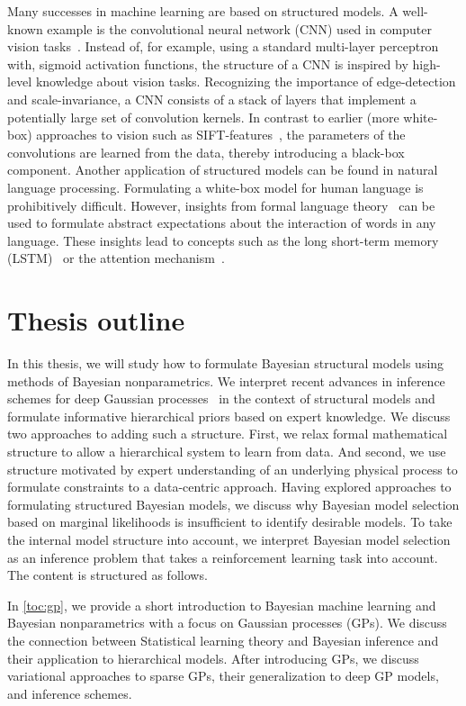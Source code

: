 Many successes in machine learning are based on structured models.
A well-known example is the convolutional neural network (CNN) used in computer vision tasks~\parencite{lecun_backpropagation_1989}.
Instead of, for example, using a standard multi-layer perceptron with, sigmoid activation functions, the structure of a CNN is inspired by high-level knowledge about vision tasks.
Recognizing the importance of edge-detection and scale-invariance, a CNN consists of a stack of layers that implement a potentially large set of convolution kernels.
In contrast to earlier (more white-box) approaches to vision such as SIFT-features~\parencite{lowe_object_1999}, the parameters of the convolutions are learned from the data, thereby introducing a black-box component.
Another application of structured models can be found in natural language processing.
Formulating a white-box model for human language is prohibitively difficult.
However, insights from formal language theory~\parencite{chomsky_aspects_2014} can be used to formulate abstract expectations about the interaction of words in any language.
These insights lead to concepts such as the long short-term memory (LSTM)~\parencite{hochreiter_long_1997} or the attention mechanism~\parencite{bahdanau_neural_2014,chorowski_attention-based_2015}.


\section{Thesis outline}
In this thesis, we will study how to formulate Bayesian structural models using methods of Bayesian nonparametrics.
We interpret recent advances in inference schemes for deep Gaussian processes~\parencite{damianou_deep_2013} in the context of structural models and formulate informative hierarchical priors based on expert knowledge.
We discuss two approaches to adding such a structure.
First, we relax formal mathematical structure to allow a hierarchical system to learn from data.
And second, we use structure motivated by expert understanding of an underlying physical process to formulate constraints to a data-centric approach.
Having explored approaches to formulating structured Bayesian models, we discuss why Bayesian model selection based on marginal likelihoods is insufficient to identify desirable models.
To take the internal model structure into account, we interpret Bayesian model selection as an inference problem that takes a reinforcement learning task into account.
The content is structured as follows.

In \cref{toc:gp}, we provide a short introduction to Bayesian machine learning and Bayesian nonparametrics with a focus on Gaussian processes (GPs).
We discuss the connection between Statistical learning theory and Bayesian inference and their application to hierarchical models.
After introducing GPs, we discuss variational approaches to sparse GPs, their generalization to deep GP models, and inference schemes.

